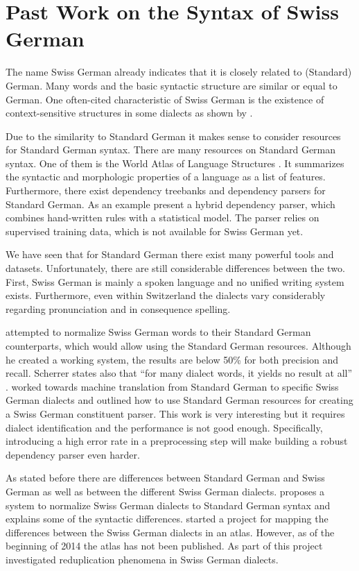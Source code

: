 \documentclass[11pt,letterpaper, covington]{article}
\begin{document}
\section{Past Work on the Syntax of Swiss German}

The name Swiss German already indicates that it is closely related to (Standard) German. Many words and the basic syntactic structure are similar or equal to German. One often-cited characteristic of Swiss German is the existence of context-sensitive structures in some dialects as shown by \cite{Shieber85}.

Due to the similarity to Standard German it makes sense to consider resources for Standard German syntax. There are many resources on Standard German syntax. One of them is the World Atlas of Language Structures \citep{DH13}. It summarizes the syntactic and morphologic properties of a language as a list of features. Furthermore, there exist dependency treebanks and dependency parsers for Standard German. As an example \citet{SSVW09} present a hybrid dependency parser, which combines hand-written rules with a statistical model. The parser relies on supervised training data, which is not available for Swiss German yet.

We have seen that for Standard German there exist many powerful tools and datasets. Unfortunately, there are still considerable differences between the two. First, Swiss German is mainly a spoken language and no unified writing system exists. Furthermore, even within Switzerland the dialects vary considerably regarding pronunciation and in consequence spelling. 

\citet{Scherrer07} attempted to normalize Swiss German words to their Standard German counterparts, which would allow using the Standard German resources. Although he created a working system, the results are below 50\% for both precision and recall. Scherrer states also that ``for many dialect words, it yields no result at all'' \citep[p. 60]{Scherrer07}. \citet{SR10} worked towards machine translation from Standard German to specific Swiss German dialects and outlined how to use Standard German resources for creating a Swiss German constituent parser. This work is very interesting but it requires dialect identification and the performance is not good enough. Specifically, introducing a high error rate in a preprocessing step will make building a robust dependency parser even harder. 

As stated before there are differences between Standard German and Swiss German as well as between the different Swiss German dialects. \citet{Scherrer11} proposes a system to normalize Swiss German dialects to Standard German syntax and explains some of the syntactic differences. \citet{BG02} started a project for mapping the differences between the Swiss German dialects in an atlas. However, as of the beginning of 2014 the atlas has not been published. As part of this project \citet{GF06} investigated reduplication phenomena in Swiss German dialects. 
\end{document}
